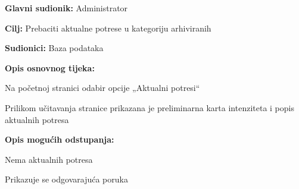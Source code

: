 					\noindent {}
					\begin{packed_item}
	
						\item \textbf{Glavni sudionik:} Administrator
						\item \textbf{Cilj:} Prebaciti aktualne potrese u kategoriju arhiviranih
						\item \textbf{Sudionici:} Baza podataka

						\item \textbf{Opis osnovnog tijeka:}
						
						\item[] \begin{packed_enum}
							\item Na početnoj stranici odabir opcije „Aktualni potresi“
							\item Prilikom učitavanja stranice prikazana je preliminarna karta intenziteta i popis aktualnih potresa
						\end{packed_enum}
						
						\item  \textbf{Opis mogućih odstupanja:}
						
						\item[] \begin{packed_item}
	
							\item[2.a] Nema aktualnih potresa
							\item[] \begin{packed_enum}
								
								\item Prikazuje se odgovarajuća poruka
								
							\end{packed_enum}
							
						\end{packed_item}
						
					\end{packed_item}

